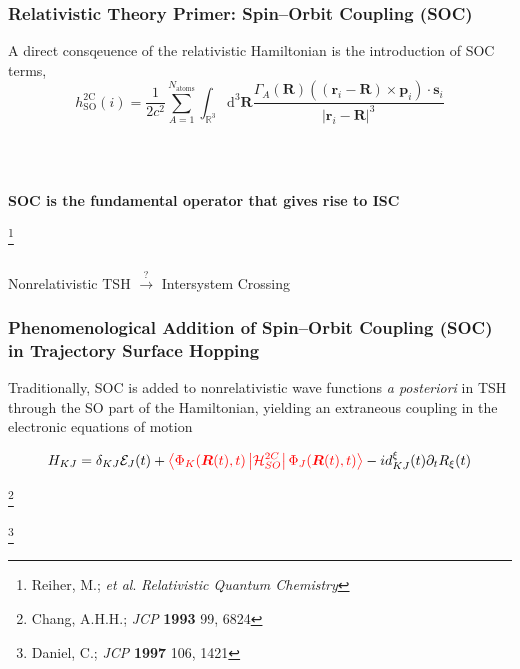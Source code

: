 \documentclass[usepdftitle=false,10pt]{beamer}
\newcommand{\innerop}[3]{\left\langle #1 \left\vert #2 \right\vert #3 \right\rangle}  %
\newcommand*\vc[1]{\boldsymbol{#1}}
\newcommand\blfootnote[1]{%
  \begingroup
  \renewcommand\thefootnote{}\footnote{#1}%
  \addtocounter{footnote}{-1}%
  \endgroup
}
\begin{document}
\begin{frame}
  \frametitle{Relativistic Theory Primer: Spin--Orbit Coupling (SOC)}

  A direct consqeuence of the relativistic Hamiltonian is the introduction of SOC terms,
  \begin{equation*}
    h^\mathrm{2C}_\mathrm{SO} (i) = \frac{1}{2c^2} \sum_{A=1}^{N_\mathrm{atoms}}
      \int_{\mathbb{R}^3}\mathrm{d}^3\vc{R}
      \frac{\Gamma_A(\vc{R})
        (( \vc{r}_i - \vc{R} ) \times \vc{p}_i)\cdot \vc{s}_i}
	{\vert \vc{r}_i - \vc{R} \vert^3}
  \end{equation*}

  ~\\
  ~\\
  \begin{center}
  {\LARGE \bf SOC is the fundamental operator that gives rise to ISC}
  \end{center}
  \blfootnote{\tiny Reiher, M.; \emph{et al}. \emph{Relativistic Quantum Chemistry}}
\end{frame}

\begin{frame}
\frametitle{}
\begin{center}
{\LARGE
  Nonrelativistic TSH $\xrightarrow{?}$ Intersystem Crossing
}
\end{center}
\end{frame}


\begin{frame}
  \frametitle{Phenomenological Addition of Spin--Orbit Coupling (SOC) in
  Trajectory Surface Hopping}

  Traditionally, SOC is added to nonrelativistic wave functions 
  \emph{a posteriori} in TSH through the SO part of the 
  Hamiltonian, yielding an extraneous coupling in the electronic equations of motion

%

  \begin{equation*}
    H_{KJ} = \delta_{KJ}\mathcal{E}_J(t) +
    {\color{red}
      \innerop{\Phi_K(\vc{R}(t),t)}{\mathcal{H}_{SO}^{2C}}{\Phi_J(\vc{R}(t),t)}
    }
    - i d_{KJ}^\xi (t) \partial_t R_{\xi}(t) 
  \end{equation*}

  \vfill
  \blfootnote{\tiny Chang, A.H.H.; \emph{JCP} \textbf{1993} 99, 6824}
  \blfootnote{\tiny Daniel, C.; \emph{JCP} \textbf{1997} 106, 1421}
\end{frame}
\end{document}
